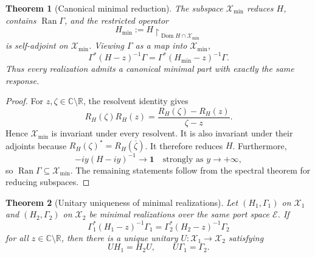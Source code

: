 \documentclass[11pt,reqno]{scrartcl}
\newcommand{\CC}{\mathbb C}
\newcommand{\RR}{\mathbb R}
\newcommand{\idop}{\mathbf 1}
\DeclareMathOperator{\Dom}{Dom}
\DeclareMathOperator{\Ran}{Ran}
\newcommand{\restr}[2]{#1\!\upharpoonright_{#2}}
\newcommand{\scrX}{\mathscr X}
\newcommand{\scrE}{\mathscr E}
\newcommand{\Hmin}{\mathscr X_{\min}}
\theoremstyle{plain}
\newtheorem{theorem}{Theorem}[section]
\theoremstyle{definition}
\theoremstyle{remark}
\begin{document}
\begin{theorem}[Canonical minimal reduction]
\label{thm:canonical-minimal-reduction}
The subspace \(\Hmin\) reduces \(H\), contains \(\Ran\Gamma\), and the
restricted operator
\begin{equation}
  H_{\min}:=\restr{H}{\Dom H\cap\Hmin}
  \label{eq:Hmin}
\end{equation}
is self-adjoint on \(\Hmin\).  Viewing \(\Gamma\) as a map into \(\Hmin\),
\begin{equation}
  \boxed{
  \Gamma^*(H-z)^{-1}\Gamma
  =\Gamma^*(H_{\min}-z)^{-1}\Gamma.}
  \label{eq:minimal-response-invariance}
\end{equation}
Thus every realization admits a canonical minimal part with exactly the same
response.
\end{theorem}

\begin{proof}
For \(z,\zeta\in\CC\setminus\RR\), the resolvent identity gives
\begin{equation}
  R_H(\zeta)R_H(z)
  =\frac{R_H(\zeta)-R_H(z)}{\zeta-z}.
\end{equation}
Hence \(\Hmin\) is invariant under every resolvent.  It is also invariant
under their adjoints because \(R_H(\zeta)^*=R_H(\overline\zeta)\).  It
therefore reduces \(H\).  Furthermore,
\begin{equation}
  -iy(H-iy)^{-1}\longrightarrow\idop
  \quad\text{strongly as }y\to+\infty,
\end{equation}
so \(\Ran\Gamma\subseteq\Hmin\).  The remaining statements follow from the
spectral theorem for reducing subspaces.
\end{proof}

\begin{theorem}[Unitary uniqueness of minimal realizations]
\label{thm:minimal-uniqueness}
Let \((H_1,\Gamma_1)\) on \(\scrX_1\) and \((H_2,\Gamma_2)\) on
\(\scrX_2\) be minimal realizations over the same port space \(\scrE\).  If
\begin{equation}
  \Gamma_1^*(H_1-z)^{-1}\Gamma_1
  =\Gamma_2^*(H_2-z)^{-1}\Gamma_2
  \label{eq:equal-minimal-responses}
\end{equation}
for all \(z\in\CC\setminus\RR\), then there is a unique unitary
\(U:\scrX_1\to\scrX_2\) satisfying
\begin{equation}
  UH_1=H_2U,
  \qquad
  U\Gamma_1=\Gamma_2.
  \label{eq:minimal-unitary-equivalence}
\end{equation}
\end{theorem}
\end{document}
